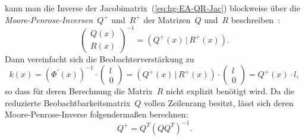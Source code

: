 kann man die Inverse der Jacobimatrix~(\ref{eq:hg-EA-QR-Jac}) blockweise
über die \emph{Moore-Penrose-Inversen}~$Q^{+}$
und~$R^{+}$ der Matrizen~$Q$ und~$R$ beschreiben~\cite{boullion71,rao71,ben-israel}:
\[
\left(\begin{array}{c}
Q(x)\\
R(x)
\end{array}\right)^{-1}=\left(Q^{+}(x)\,|\,R^{+}(x)\right).
\]
Dann vereinfacht sich die Beobachterverstärkung zu
\begin{equation}
k(x)=\left(\Phi^{\prime}(x)\right)^{-1}\cdot\left(\begin{array}{c}
l\\
0
\end{array}\right)=\left(Q^{+}(x)\,|\,R^{+}(x)\right)\cdot\left(\begin{array}{c}
l\\
0
\end{array}\right)=Q^{+}(x)\cdot l,\label{eq:hg-k-Moore-Penrose-Inverse}
\end{equation}
so dass für deren Berechnung die Matrix~$R$ nicht explizit benötigt
wird. Da die reduzierte Beobachtbarkeitsmatrix~$Q$ vollen Zeilenrang
besitzt, lässt sich deren Moore-Penrose-Inverse folgendermaßen berechnen:
\[
Q^{+}=Q^{T}\left(QQ^{T}\right)^{-1}.
\]


